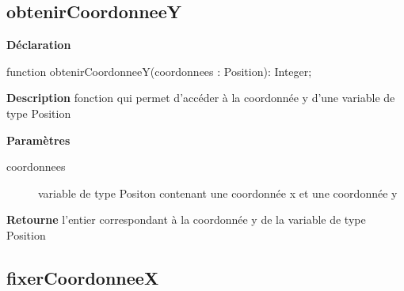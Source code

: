 \documentclass{report}
\newif\ifpdf
\begin{document}
\subsection*{obtenirCoordonneeY}
\fi
\label{Types-obtenirCoordonneeY}
\begin{list}{}{
\setlength{\itemindent}{0cm}
\setlength{\listparindent}{0cm}
\setlength{\leftmargin}{\evensidemargin}
\addtolength{\leftmargin}{\tmplength}
\settowidth{\labelsep}{X}
\addtolength{\leftmargin}{\labelsep}
\setlength{\labelwidth}{\tmplength}
}
\item[\textbf{Déclaration}\hfill]
\ifpdf
\begin{flushleft}
\fi
\begin{ttfamily}
function obtenirCoordonneeY(coordonnees : Position): Integer;\end{ttfamily}

\ifpdf
\end{flushleft}
\fi

\par
\item[\textbf{Description}]
fonction qui permet d'accéder à la coordonnée y d'une variable de type Position  \par
\item[\textbf{Paramètres}]
\begin{description}
\item[coordonnees] variable de type Positon contenant une coordonnée x et une coordonnée y
\end{description}
\item[\textbf{Retourne}]l'entier correspondant à la coordonnée y de la variable de type Position


\end{list}
\ifpdf
\subsection*{\large{\textbf{fixerCoordonneeX}}\normalsize\hspace{1ex}\hrulefill}
\else
\end{document}
